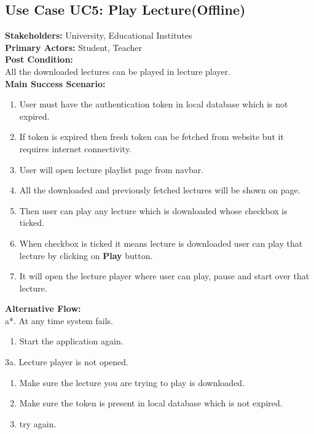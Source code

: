 \subsection{Use Case UC5: Play Lecture(Offline)}
\textbf{Stakeholders: } University, Educational Institutes \\
\textbf{Primary Actors: } Student, Teacher \\
\textbf{Post Condition: }\\
All the downloaded lectures can be played in lecture player.\\
\textbf{Main Success Scenario: }
\begin{enumerate}
\item User must have the authentication token in local database which is not expired.
\item If token is expired then fresh token can be fetched from website but it requires internet connectivity.
\item User will open lecture playlist page from navbar.
\item All the downloaded and previously fetched lectures will be shown on page.
\item Then user can play any lecture which is downloaded whose checkbox is ticked.
\item When checkbox is ticked it means lecture is downloaded user can play that lecture by clicking on \textbf{Play} button.
\item It will open the lecture player where user can play, pause and start over that lecture.

\end{enumerate}
\textbf{Alternative Flow: }\\
a*. At any time system fails.
\begin{enumerate}
\item Start the application again.
\end{enumerate}
3a. Lecture player is not opened.
\begin{enumerate}
\item Make sure the lecture you are trying to play is downloaded.
\item Make sure the token is present in local database which is not expired.
\item try again.
\end{enumerate}



